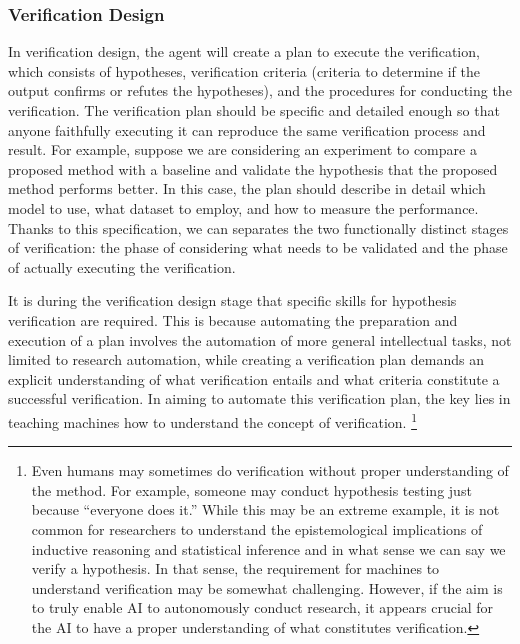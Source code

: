 \subsubsection{Verification Design} 
In verification design, the agent will create a plan to execute the verification, which consists of hypotheses, verification criteria (criteria to determine if the output confirms or refutes the hypotheses), and the procedures for conducting the verification. The verification plan should be specific and detailed enough so that anyone faithfully executing it can reproduce the same verification process and result. For example, suppose we are considering an experiment to compare a proposed method with a baseline and validate the hypothesis that the proposed method performs better. In this case, the plan should describe in detail which model to use, what dataset to employ, and how to measure the performance. Thanks to this specification, we can separates the two functionally distinct stages of verification: the phase of considering what needs to be validated and the phase of actually executing the verification.

It is during the verification design stage that specific skills for hypothesis verification are required. This is because automating the preparation and execution of a plan involves the automation of more general intellectual tasks, not limited to research automation, while creating a verification plan demands an explicit understanding of what verification entails and what criteria constitute a successful verification. In aiming to automate this verification plan, the key lies in teaching machines how to understand the concept of verification. \footnote{
Even humans may sometimes do verification without proper understanding of the method. For example, someone may conduct hypothesis testing just because ``everyone does it.'' While this may be an extreme example, it is not common for researchers to understand the epistemological implications of inductive reasoning and statistical inference and in what sense we can say we verify a hypothesis. In that sense, the requirement for machines to understand verification may be somewhat challenging. However, if the aim is to truly enable AI to autonomously conduct research, it appears crucial for the AI to have a proper understanding of what constitutes verification.
}



